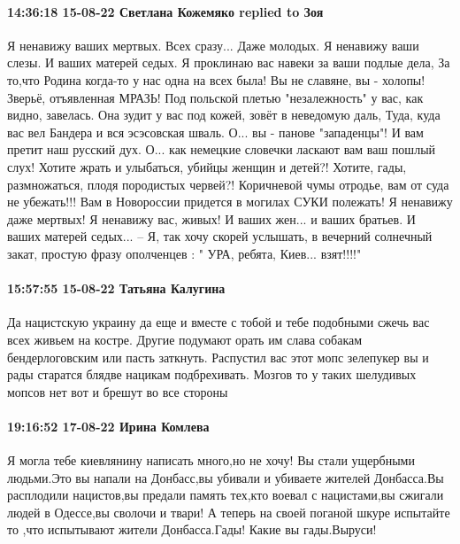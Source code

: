 
 
 
 
 

\paragraph{14:36:18 15-08-22 Светлана Кожемяко replied to Зоя}

\obeycr
Я ненавижу ваших мертвых. Всех сразу... Даже молодых.
Я ненавижу ваши слезы. И ваших матерей седых.
Я проклинаю вас навеки за ваши подлые дела,
За то,что Родина когда-то у нас одна на всех была!
Вы не славяне, вы - холопы! Зверьё, отъявленная МРАЗЬ!
Под польской плетью "незалежность" у вас, как видно, завелась.
Она зудит у вас под кожей, зовёт в неведомую даль,
Туда, куда вас вел Бандера и вся эсэсовская шваль.
О... вы - панове "западенцы"! И вам претит наш русский дух.
О... как немецкие словечки ласкают вам ваш пошлый слух!
Хотите жрать и улыбаться, убийцы женщин и детей?!
Хотите, гады, размножаться, плодя породистых червей?!
Коричневой чумы отродье, вам от суда не убежать!!!
Вам в Новороссии придется в могилах СУКИ полежать!
Я ненавижу даже мертвых! Я ненавижу вас, живых!
И ваших жен... и ваших братьев. И ваших матерей седых...
-- Я, так хочу скорей услышать,
в вечерний солнечный закат,
простую фразу ополченцев :
" УРА, ребята, Киев... взят!!!!"
\restorecr

\paragraph{15:57:55 15-08-22 Татьяна Калугина}

Да нацистскую украину да еще и вместе с тобой и тебе подобными сжечь вас всех
живьем на костре. Другие подумают орать им слава собакам бендерлоговским или
пасть заткнуть. Распустил вас этот мопс зелепукер вы и рады старатся блядве
нацикам подбрехивать. Мозгов то у таких шелудивых мопсов нет вот и брешут во
все стороны

\paragraph{19:16:52 17-08-22 Ирина Комлева}

Я могла тебе киевлянину написать много,но не хочу! Вы стали ущербными
людьми.Это вы напали на Донбасс,вы убивали и убиваете жителей Донбасса.Вы
расплодили нацистов,вы предали память тех,кто воевал с нацистами,вы сжигали
людей в Одессе,вы сволочи и твари! А теперь на своей поганой шкуре испытайте то
,что испытывают жители Донбасса.Гады! Какие вы гады.Выруси!

